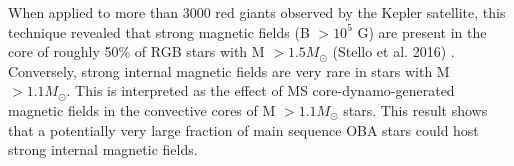 When applied to more than 3000 red giants observed by the Kepler satellite, this technique revealed that
strong magnetic fields (B $> 10^5$ G) are present in the core of roughly 50\% of RGB stars with M $> 1.5M_\odot$ (Stello et al. 2016) \citep{Stello_2016}.
Conversely, strong internal magnetic fields are very rare in stars with M $> 1.1M_\odot$. This is interpreted as the
effect of MS core-dynamo-generated magnetic fields in the convective cores of M $> 1.1M_\odot$ stars.
This result shows that a potentially very large fraction of main sequence OBA stars could host strong internal magnetic fields.



